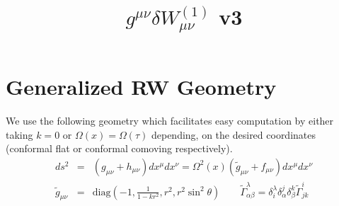 \documentclass[10pt,letterpaper]{article}
\title{$g^{\mu\nu}\delta W^{(1)}_{\mu\nu}$ v3}
\date{}
\numberwithin{equation}{section}
\begin{document}
 
\maketitle
\noindent 
\section{Generalized RW Geometry}
We use the following geometry which facilitates easy computation by either taking $k=0$ or $\Omega(x) = \Omega(\tau)$ depending, on the desired coordinates (conformal flat or conformal comoving respectively). 
\begin{eqnarray}
ds^2 &=& (g_{\mu\nu} + h_{\mu\nu})dx^\mu dx^\nu = \Omega^2(x)(\tilde g_{\mu\nu} + f_{\mu\nu})dx^\mu dx^\nu
\label{geom1}\\
\tilde g_{\mu\nu} &=& \text{diag}\left(-1,\frac{1}{1-kr^2},r^2,r^2\sin^2\theta\right)\qquad \tilde \Gamma^{\lambda}_{\alpha\beta} = \delta^\lambda_i \delta^j_\alpha \delta^k_\beta \tilde \Gamma^{i}_{jk}
\end{eqnarray}
%
\end{document}
